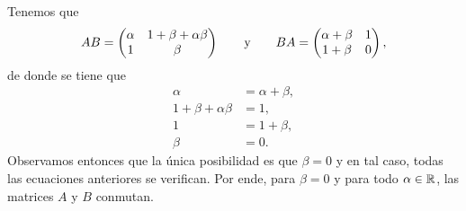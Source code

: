 \documentclass[11pt,respuestas,a4]{aleph-examen}
\begin{document}
\begin{preguntas}
\begin{respuesta}
    Tenemos que 
    \[
        AB = \begin{pmatrix}
            \alpha & 1 + \beta + \alpha\beta \\
            1 & \beta
        \end{pmatrix} \qquad\text{y}\qquad BA = \begin{pmatrix}
            \alpha+\beta & 1 \\
            1+\beta & 0
        \end{pmatrix},
    \]
    de donde se tiene que 
    \begin{align*}
        \alpha &= \alpha + \beta, \\
        1 + \beta + \alpha\beta &= 1, \\
        1 &= 1 + \beta, \\
        \beta &= 0.
    \end{align*}
    Observamos entonces que la única posibilidad es que $\beta = 0$ y en tal caso, todas las ecuaciones anteriores se verifican. Por ende, para $\beta=0$ y para todo $\alpha\in\mathbb{R}$, las matrices $A$ y $B$ conmutan.
\end{respuesta}

\end{preguntas}
\end{document}
